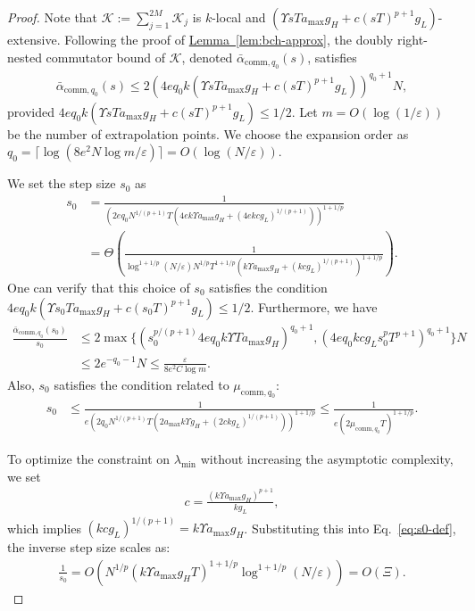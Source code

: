 \documentclass[11pt]{article}
\newcommand{\lem}[1]{\hyperref[lem:#1]{Lemma~\ref*{lem:#1}}}
\newcommand{\eps}{\varepsilon}
\newcommand{\mc}{\mathcal}
\begin{document}
\begin{proof}
    Note that $\mc K:= \sum_{j=1}^{2M} {\mc K}_j$ is $k$-local and $(\Upsilon sT a_{\max}g_H+c(sT)^{p+1} g_L)$-extensive.
    Following the proof of \lem{bch-approx}, the doubly right-nested commutator bound of $\mc K$, denoted $\bar{\alpha}_{\mathrm{comm}, q_0}(s)$, satisfies 
    \begin{align*}
        \bar{\alpha}_{\mathrm{comm}, q_0}(s) \le 2(4eq_0 k(\Upsilon sT a_{\max}g_H+c(sT)^{p+1} g_L))^{q_0+1}N,
    \end{align*}
    provided $4eq_0 k(\Upsilon sT a_{\max}g_H+c(sT)^{p+1} g_L) \le 1/2$. 
    Let $m=O(\log(1/\eps))$ be the number of extrapolation points. We choose the expansion order as $q_0 = \lceil \log(8e^2N\log m/\eps) \rceil = O(\log(N/\eps))$. 
    
    We set the step size $s_0$ as
    \begin{align}
    \label{eq:s0-def}
        s_0 &= \frac{1}{(2eq_0 N^{1/(p+1)}T (4ek \Upsilon a_{\max} g_H + (4ekcg_L )^{1/(p+1)}))^{1+1/p}} \\
        & = \Theta\left( \frac{1}{ \log^{1+1/p}(N/\eps)  N^{1/p}T^{1+1/p}(k\Upsilon a_{\max} g_H +(kcg_L)^{1/(p+1)})^{1+1/p} } \right).\nonumber
    \end{align}
    One can verify that this choice of $s_0$ satisfies the condition $4eq_0 k(\Upsilon s_0T a_{\max}g_H+c(s_0T)^{p+1} g_L) \le 1/2$.
    Furthermore, we have
    \begin{align*}
         \frac{\bar{\alpha}_{\mathrm{comm}, q_0}(s_0)}{s_0} & \le 2\max\{(s_0^{p/(p+1)}4eq_0k\Upsilon T a_{\max} g_H)^{q_0+1}, (4eq_0kcg_L s_0 ^pT^{p+1})^{q_0+1}\}N \\
         &\le 2e^{-q_0-1}N \le \frac{\eps}{8e^2C \log m}.
    \end{align*}
    Also, $s_0$ satisfies the condition related to $\mu_{\mathrm{comm}, q_0}$:
    \begin{align*}
        s_0 &\le \frac{1}{e(2q_0 N^{1/(p+1)} T(2 a_{\max} k\Upsilon g_H + (2ckg_L)^{1/(p+1)}))^{1+1/p}} \le \frac{1}{e(2\mu_{\mathrm{comm}, q_0}T)^{1+1/p}}. 
    \end{align*}
    
    To optimize the constraint on $\lambda_{\min}$ without increasing the asymptotic complexity, we set
    \begin{align}
    \label{eq:def-c}
        c = \frac{(k\Upsilon a_{\max}g_H)^{p+1}}{kg_L},
    \end{align}
    which implies $(kcg_L)^{1/(p+1)} = k\Upsilon a_{\max}g_H$. Substituting this into Eq.~\eqref{eq:s0-def}, the inverse step size scales as:
    \begin{align*}
        \frac{1}{s_0} = O\left( N^{1/p}(k\Upsilon a_{\max} g_H T)^{1+1/p} \log^{1+1/p}(N/\eps) \right) = O(\Xi).
    \end{align*}


\end{proof}
\end{document}
